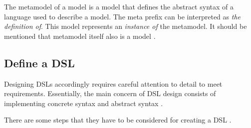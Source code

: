 The metamodel of a model is a model that defines the abstract syntax of a language used to describe a model. The meta prefix can be interpreted as \textit{the definition of}. This model represents an \textit{instance of} the metamodel. It should be mentioned that metamodel itself also is a model \cite{dsl-eng}.

\subsection{Define a DSL}
Designing DSLs accordingly requires careful attention to detail to meet requirements. Essentially, the main concern of DSL design consists of implementing concrete syntax and abstract syntax \cite{engineering_modeling_languages}.
 
There are some steps that they have to be considered for creating a DSL \cite{mdsd_en}.

